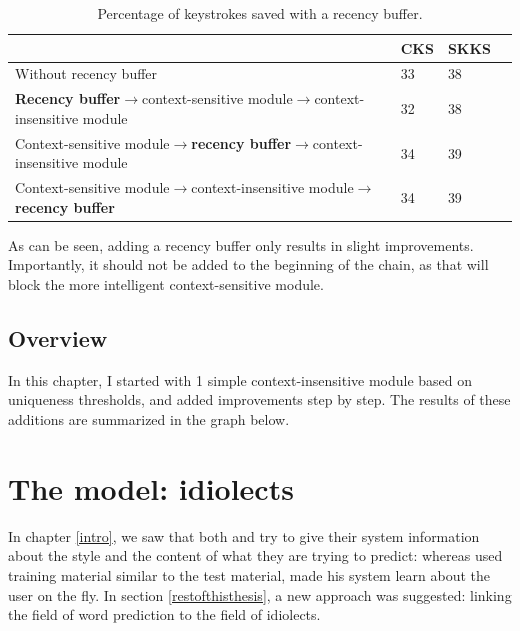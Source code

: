 \documentclass[12pt]{article}
\let\stdsection\section
\renewcommand\section{\newpage\stdsection}
\begin{document}
\begin{table}[h]
\begin{tabular}{l|lll} 

&CKS&SKKS\\
\hline
Without recency buffer&33&38\\
\textbf{Recency buffer}$\rightarrow$context-sensitive module$\rightarrow$context-insensitive module&32&38\\
Context-sensitive module$\rightarrow$\textbf{recency buffer}$\rightarrow$context-insensitive module&34&39\\
Context-sensitive module$\rightarrow$context-insensitive module$\rightarrow$\textbf{recency buffer}&34&39\\
\end{tabular} 
\caption{Percentage of keystrokes saved with a recency buffer.} \label{results_rb}
\end{table}

As can be seen, adding a recency buffer only results in slight improvements. Importantly, it should not be added to the beginning of the chain, as that will block the more intelligent context-sensitive module.


\subsection{Overview}
In this chapter, I started with 1 simple context-insensitive module based on uniqueness thresholds, and added improvements step by step. The results of these additions are summarized in the graph below.






\section{The model: idiolects} \label{model}

In chapter \ref{intro}, we saw that both  and  try to give their system information about the style and the content of what they are trying to predict: whereas  used training material similar to the test material,  made his system learn about the user on the fly. In section \ref{restofthisthesis}, a new approach was suggested: linking the field of word prediction to the field of idiolects.

\end{document}
